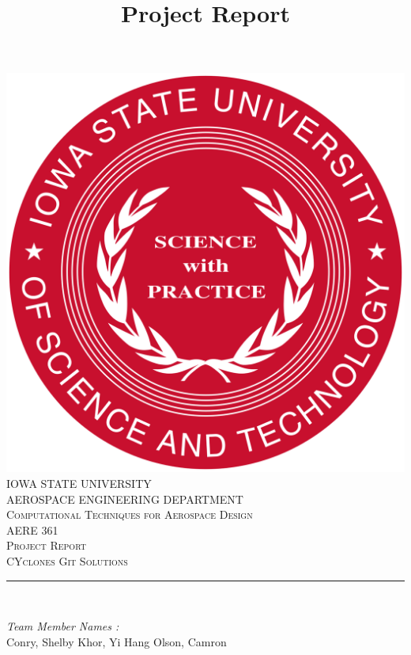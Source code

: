 \documentclass[12pt]{article}
\begin{document}
\title{Project Report}

\begin{titlepage}
	\centering
    \vspace*{0.5 cm}
    \includegraphics[scale = 0.11]{isu_seal.png}\\[1.0 cm]	%
    \textsc{\LARGE IOWA STATE UNIVERSITY}\\[2.0 cm]
    \textsc{\large AEROSPACE ENGINEERING DEPARTMENT}\\[0.2 cm]
    \textsc{\large Computational Techniques for Aerospace Design}\\[0.2 cm]
	\textsc{\Large AERE 361}\\[0.5 cm]				%
	\textsc{\Large Project Report}\\[0.2 cm]
	\textsc{\Large CYclones Git Solutions}\\[0.2 cm]
	\rule{\linewidth}{0.2 mm} \\[0.4 cm]
	
	
	\begin{minipage}{0.8\textwidth}
		
			\begin{flushleft} 
			\emph{Team Member Names :} \\
			Conry, Shelby\linebreak
			Khor, Yi Hang\linebreak
			Olson, Camron\linebreak
			
		\end{flushleft}
	\end{minipage}\\[2 cm]
	
	\vfill
	
\end{titlepage}
\end{document}
